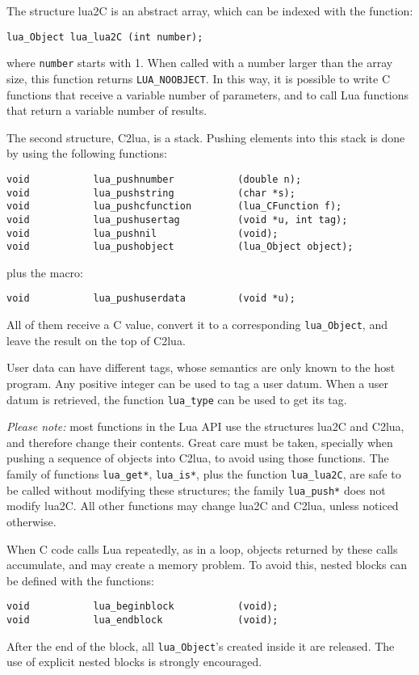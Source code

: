 The structure lua2C is an abstract array,
which can be indexed with the function:
\begin{verbatim}
lua_Object lua_lua2C (int number);
\end{verbatim}
where \verb'number' starts with 1.
When called with a number larger than the array size,
this function returns
\verb'LUA_NOOBJECT'.
In this way, it is possible to write C functions that receive
a variable number of parameters,
and to call Lua functions that return a variable number of results.

The second structure, C2lua, is a stack.
Pushing elements into this stack
is done by using the following functions:
\label{pushing}
\begin{verbatim}
void           lua_pushnumber           (double n);
void           lua_pushstring           (char *s);
void           lua_pushcfunction        (lua_CFunction f);
void           lua_pushusertag          (void *u, int tag);
void           lua_pushnil              (void);
void           lua_pushobject           (lua_Object object);
\end{verbatim}
plus the macro:
\begin{verbatim}
void           lua_pushuserdata         (void *u);
\end{verbatim}
All of them receive a C value,
convert it to a corresponding \verb'lua_Object',
and leave the result on the top of C2lua.

User data can have different tags,
whose semantics are only known to the host program.
Any positive integer can be used to tag a user datum.
When a user datum is retrieved,
the function \verb'lua_type' can be used to get its tag.

{\em Please note:} most functions in the Lua API
use the structures lua2C and C2lua,
and therefore change their contents.
Great care must be taken,
specially when pushing a sequence of objects into C2lua,
to avoid using those functions.
The family of functions \verb|lua_get*|, \verb|lua_is*|,
plus the function \verb|lua_lua2C|,
are safe to be called without modifying these structures;
the family \verb|lua_push*| does not modify lua2C.
All other functions may change lua2C and C2lua,
unless noticed otherwise.

When C code calls Lua repeatedly, as in a loop,
objects returned by these calls accumulate,
and may create a memory problem.
To avoid this,
nested blocks can be defined with the functions:
\begin{verbatim}
void           lua_beginblock           (void);
void           lua_endblock             (void);
\end{verbatim}
After the end of the block,
all \verb'lua_Object''s created inside it are released.
The use of explicit nested blocks is strongly encouraged.

